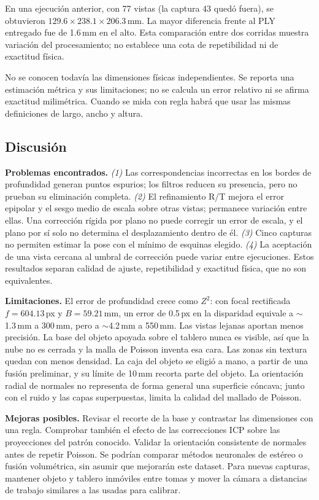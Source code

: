 \documentclass[10pt,a4paper]{article}
\begin{document}
En una ejecución anterior, con 77 vistas (la captura 43 quedó fuera), se obtuvieron
$129.6\times238.1\times206.3$\,mm. La mayor diferencia frente al PLY entregado fue de
1.6\,mm en el alto. Esta comparación entre dos corridas muestra variación del
procesamiento; no establece una cota de repetibilidad ni de exactitud física.

No se conocen todavía las dimensiones físicas independientes. Se reporta una estimación
métrica y sus limitaciones; no se calcula un error relativo ni se afirma exactitud milimétrica.
Cuando se mida con regla habrá que usar las mismas definiciones de largo, ancho y altura.

\clearpage
\subsection{Discusión}

\textbf{Problemas encontrados.} \emph{(1)} Las correspondencias incorrectas en los bordes de
profundidad generan puntos espurios; los filtros reducen su presencia, pero no prueban su
eliminación completa. \emph{(2)} El refinamiento R/T mejora el error epipolar y el sesgo
medio de escala sobre otras vistas; permanece variación entre ellas. Una corrección rígida
por plano no puede corregir un error de escala, y el plano por sí solo no determina el
desplazamiento dentro de él. \emph{(3)} Cinco capturas no permiten estimar la pose con el
mínimo de esquinas elegido. \emph{(4)} La aceptación de una vista cercana al umbral de
corrección puede variar entre ejecuciones. Estos resultados separan calidad de ajuste,
repetibilidad y exactitud física, que no son equivalentes.

\textbf{Limitaciones.} El error de profundidad crece como $Z^2$: con focal rectificada
$f\!=\!604.13$\,px y $B\!=\!59.21$\,mm,
un error de 0.5\,px en la disparidad equivale a $\sim$1.3\,mm a 300\,mm, pero a $\sim$4.2\,mm a
550\,mm. Las vistas lejanas aportan menos precisión. La base del objeto apoyada sobre el tablero
nunca es visible, así que la nube no es cerrada y la malla de Poisson inventa esa cara. Las
zonas sin textura quedan con menos densidad. La caja del objeto se eligió a mano, a partir
de una fusión preliminar, y su límite de 10\,mm recorta parte del objeto. La orientación
radial de normales no representa de forma general una superficie cóncava; junto con el
ruido y las capas superpuestas, limita la calidad del mallado de Poisson.

\textbf{Mejoras posibles.} Revisar el recorte de la base y contrastar las dimensiones con
una regla. Comprobar también el efecto de las correcciones ICP sobre las proyecciones
del patrón conocido. Validar la orientación consistente
de normales antes de repetir Poisson. Se podrían comparar métodos neuronales de estéreo
o fusión volumétrica, sin asumir que mejorarán este dataset. Para nuevas capturas, mantener
objeto y tablero inmóviles entre tomas y mover la cámara a distancias de trabajo similares
a las usadas para calibrar.
\end{document}
